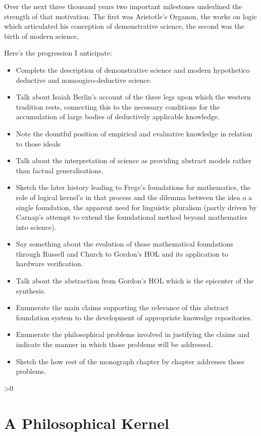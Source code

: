 \documentclass[10pt,titlepage]{book}
\newcommand{\resetnotes}{%
  \ifnum\value{endnote}>0%
  \theendnotes%
  \setcounter{endnote}{0}%
  \else%
  \fi%
}
\begin{document}
Over the next three thousand years two important milestones underlined the strength of that motivation.
The first was Aristotle's Organon, the works on logic which articulated his conception of demonstrative science, the second was the birth of modern science, 

Here's the progression I anticipate:
\begin{itemize}
\item Complete the description of demonstrative science and modern hypothetico deductive and nomoogico-deductive science.
\item Talk about Isaiah Berlin's account of the three legs upon which the western tradition rests, connecting this to the necessary conditions for the accumulation of large bodies of deductively applicable knowledge.
\item Note the dountful position of empirical and evaluative knowledge in relation to those ideals
\item Talk about the interpretation of science as providing abstract models rather than factual generalisations.
\item Sketch the later history leading to Frege's foundations for mathematics, the role of logical kernel's in that process and the dilemma between the idea o a single foundation, the apparent need for linguistic pluralism (partly driven by Carnap's attempt to extend the foundational method beyond mathematics into science).
\item Say something about the evolution of those mathematical foundations through Russell and Church to Gordon's HOL and its application to hardware verification.

\item Talk about the abstraction from Gordon's HOL which is the epicenter of the synthesis.
\item Enumerate the main claims supporting the relevance of this abstract foundation system to the development of appropriate knowedge repositories.
\item Enumerate the philosophical problems involved in justifying the claims and indicate the manner in which those problems will be addressed.
\item Sketch the how rest of the monograph chapter by chapter addresses those problems.
\end{itemize}

\cite{couturat1901logique}


\resetnotes

\chapter{A Philosophical Kernel}\label{PK}
\end{document}
